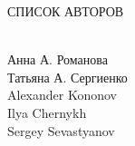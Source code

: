 \documentclass[12pt,twoside]{article}
\begin{document}
\setcounter{page}{5} \pagebreak

%
%
%
\pagebreak
\setcounter{equation}{0}
\label{lbl101} \label{lbl102} \label{lbl103} %

%
\pagebreak
\setcounter{equation}{0}
\label{lbl104} \label{lbl105} %


\pagebreak
\markboth{ }{ }
\vspace{-10mm}
\begin{center} СПИСОК АВТОРОВ \end{center}
\vspace{-5mm}
\label{List}
\vspace{5mm}
\noindent
\\Анна А. Романова \dotfill \pageref{lbl104}
\\Татьяна А. Сергиенко \dotfill \pageref{lbl105}
\\Alexander Kononov \dotfill \pageref{lbl102}
\\Ilya Chernykh \dotfill \pageref{lbl101}
\\Sergey Sevastyanov \dotfill \pageref{lbl103}
\end{document}
